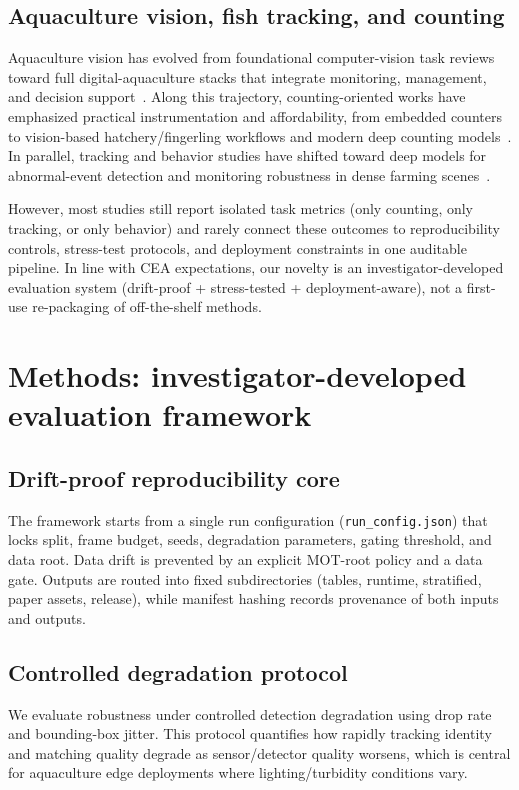 \documentclass[preprint,12pt]{elsarticle}
\begin{document}
\subsection{Aquaculture vision, fish tracking, and counting}
Aquaculture vision has evolved from foundational computer-vision task reviews toward full digital-aquaculture stacks that integrate monitoring, management, and decision support~\cite{zion2012,fore2018,zhou2018feeding,li2020biomass,barbedo2022review,cui2025survey}. Along this trajectory, counting-oriented works have emphasized practical instrumentation and affordability, from embedded counters to vision-based hatchery/fingerling workflows and modern deep counting models~\cite{hernandez2018counter,albuquerque2019fingerlings,zhang2020fishcount}. In parallel, tracking and behavior studies have shifted toward deep models for abnormal-event detection and monitoring robustness in dense farming scenes~\cite{mei2022trackingreview,wang2022abnormal,zhao2024stereo}. 

However, most studies still report isolated task metrics (only counting, only tracking, or only behavior) and rarely connect these outcomes to reproducibility controls, stress-test protocols, and deployment constraints in one auditable pipeline. In line with CEA expectations, our novelty is an investigator-developed evaluation system (drift-proof + stress-tested + deployment-aware), not a first-use re-packaging of off-the-shelf methods.

\section{Methods: investigator-developed evaluation framework}
\subsection{Drift-proof reproducibility core}
The framework starts from a single run configuration (\texttt{run\_config.json}) that locks split, frame budget, seeds, degradation parameters, gating threshold, and data root. Data drift is prevented by an explicit MOT-root policy and a data gate. Outputs are routed into fixed subdirectories (tables, runtime, stratified, paper assets, release), while manifest hashing records provenance of both inputs and outputs.

\subsection{Controlled degradation protocol}
We evaluate robustness under controlled detection degradation using drop rate and bounding-box jitter. This protocol quantifies how rapidly tracking identity and matching quality degrade as sensor/detector quality worsens, which is central for aquaculture edge deployments where lighting/turbidity conditions vary.
\end{document}
